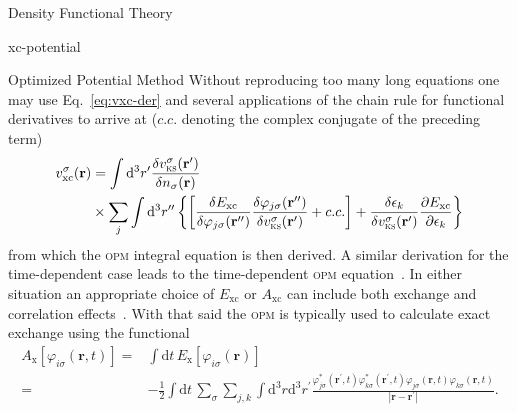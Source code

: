 \documentclass[letterpaper, 11 pt]{report}
\begin{document}
\begin{chapter}{Density Functional Theory \label{chap:dft}}
\begin{section}{xc-potential \label{sec:xcpot}}
\begin{subsection}{Optimized Potential Method \label{sec:opm}}
         Without reproducing too many long equations one may use Eq.~\eqref{eq:vxc-der} and several
         applications of the chain rule for functional derivatives to arrive at ($c.c.$ denoting the
         complex conjugate of the preceding term)
         \begin{equation} \label{eq:opm1}
            \begin{split}
               v^\sigma_\mathrm{xc}(\mathbf{r}) & = \int \mathrm{d}^3 r^\prime
                  \frac{\delta v^\sigma_\mathrm{\textsc{ks}}(\mathbf{r^\prime})}
                       {\delta n_\sigma(\mathbf{r}) } \\
                                    & \times \sum\limits_{j} \int \mathrm{d}^3 r^{\prime\prime}
               \left\{ \left[ 
               \frac{\delta E_\mathrm{xc}}{\delta \varphi_{j\sigma}(\mathbf{r^{\prime\prime}}) }
               \frac{\delta \varphi_{j\sigma}(\mathbf{r^{\prime\prime}}) }
                    {\delta v^\sigma_\mathrm{\textsc{ks}}(\mathbf{r^{\prime}}) }
               + c.c.
            \right]
               + \frac{\delta \epsilon_k}{\delta v^\sigma_\mathrm{\textsc{ks}}(\mathbf{r^{\prime}})}
              \frac{\partial E_\mathrm{xc}}{\partial \epsilon_k}
            \right\}
            \end{split}
         \end{equation}
         from which the \textsc{opm} integral equation is then derived. A similar derivation for the
         time-dependent case leads to the time-dependent \textsc{opm} equation~\cite{tdopm}. In either
         situation an appropriate choice of $E_\mathrm{xc}$ or $A_\mathrm{xc}$ can include both exchange
         and correlation effects~\cite{opm5, tdopm}. With that said the \textsc{opm} is typically used
         to calculate exact exchange using the functional
         \begin{equation} \label{eq:xfunc}
            \begin{split}
               A_\mathrm{x}[\varphi_{i\sigma}(\mathbf{r},t)]
                 = & \int \mathrm{d} t \, E_\mathrm{x}[\varphi_{i\sigma}(\mathbf{r})] \\
                = & -\frac{1}{2} \int \mathrm{d} t \, \sum\limits_\sigma \sum\limits_{j,k}
                    \int\mathrm{d}^3 r \mathrm{d}^3 r^\prime
                    \frac{ \varphi^*_{j\sigma}(\mathbf{r}^\prime,t)
                           \varphi^*_{k\sigma}(\mathbf{r}^\prime,t)
                           \varphi_{j\sigma}(\mathbf{r},t) \varphi_{k\sigma}(\mathbf{r},t)}
                   {\left| \mathbf{r} -\mathbf{r}^\prime \right|}.
            \end{split}
         \end{equation}


\end{subsection}
\end{section}
\end{chapter}
\end{document}
